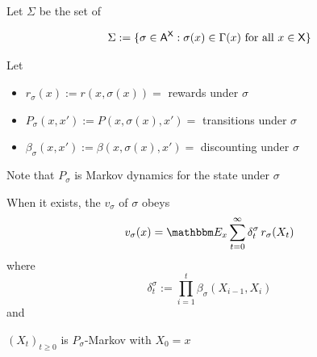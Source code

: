 \documentclass[xcolor=tex,dvipsnames]{beamer}
\begin{document}
\begin{frame}
    
    Let $\Sigma$ be the set of  

    \begin{equation*}
        \Sigma 
        := \{  \sigma \in \mathsf A^\mathsf X  : \sigma(x) \in \Gamma(x) \text{ for all } x \in \mathsf X \}
    \end{equation*}

    Let 
    \begin{itemize}
        \item $r_\sigma(x) := r(x, \sigma(x)) =$  rewards under $\sigma$
        \vspace{0.4em}
        \item $P_\sigma(x, x') := P(x, \sigma(x), x') =$ transitions under
            $\sigma$
        \vspace{0.4em}
        \item $\beta_\sigma(x, x') := \beta(x, \sigma(x), x') =$ discounting under
            $\sigma$
    \end{itemize}
        


    \vspace{0.4em}
    \vspace{0.4em}
    \vspace{0.4em}
    Note that $P_\sigma$ is Markov dynamics for the state under $\sigma$


\end{frame}

\begin{frame}
    

    When it exists, the  $v_\sigma$ of $\sigma$ obeys
    \begin{equation*}
        v_\sigma(x)
        = \EE_x \sum_{t=0}^\infty \delta_t^\sigma \, r_\sigma(X_t)
    \end{equation*}
    where 
    \begin{equation*}
        \delta_t^\sigma := 
        \prod_{i=1}^t \beta_\sigma(X_{i-1}, X_i)
    \end{equation*}
    and 
    \begin{center}
         $(X_t)_{t \geq 0}$ is $P_\sigma$-Markov with $X_0 = x$
    \end{center}

\end{frame}
\end{document}
